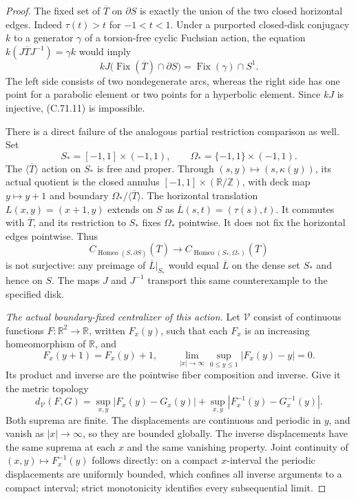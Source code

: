 \begin{proof}
The fixed set of $\overline T$ on $\partial S$ is
exactly the union of the two closed horizontal edges.
Indeed $\tau(t)>t$ for $-1<t<1$. Under a purported
closed-disk conjugacy $k$ to a generator $\gamma$ of
a torsion-free cyclic Fuchsian action, the equation
$k(J\overline T J^{-1})=\gamma k$ would imply
\[
       kJ\bigl(\operatorname{Fix}(\overline T)
                         \cap\partial S\bigr)
                  =\operatorname{Fix}(\gamma)\cap S^1.
                                                               \tag{C.71.11}
\]
The left side consists of two nondegenerate arcs,
whereas the right side has one point for a parabolic
element or two points for a hyperbolic element.
Since $kJ$ is injective, (C.71.11) is impossible.

There is a direct failure of the analogous partial
restriction comparison as well. Set
\[
 S_*=[-1,1]\times(-1,1),\qquad
 \Omega_*=\{-1,1\}\times(-1,1).
                                                               \tag{C.71.12}
\]
The $\langle\overline T\rangle$ action on $S_*$ is
free and proper. Through $(s,y)\mapsto(s,\kappa(y))$,
its actual quotient is the closed annulus
$[-1,1]\times(\mathbb R/\mathbb Z)$, with deck map
$y\mapsto y+1$ and boundary $\Omega_*/\langle\overline
T\rangle$. The horizontal translation $L(x,y)=(x+1,y)$
extends on $S$ as
$\overline L(s,t)=(\tau(s),t)$. It commutes with
$\overline T$, and its restriction to $S_*$ fixes
$\Omega_*$ pointwise. It does not fix the horizontal
edges pointwise. Thus
\[
 C_{\operatorname{Homeo}(S,\partial S)}(\overline T)
       \longrightarrow
 C_{\operatorname{Homeo}(S_*,\Omega_*)}(\overline T)
                                                               \tag{C.71.13}
\]
is not surjective: any preimage of $\overline L|_{S_*}$
would equal $\overline L$ on the dense set $S_*$ and
hence on $S$. The maps $J$ and $J^{-1}$ transport this
same counterexample to the specified disk.

\emph{The actual boundary-fixed centralizer of this action.}
Let $\mathcal V$ consist of continuous functions
$F:\mathbb R^2\to\mathbb R$, written $F_x(y)$, such that
each $F_x$ is an increasing homeomorphism of $\mathbb R$,
and
\[
 F_x(y+1)=F_x(y)+1,\qquad
 \lim_{|x|\to\infty}\sup_{0\leq y\leq1}
                         |F_x(y)-y|=0 .
                                                               \tag{C.71.14}
\]
Its product and inverse are the pointwise fiber
composition and inverse. Give it the metric topology
\[
 d_{\mathcal V}(F,G)=
  \sup_{x,y}|F_x(y)-G_x(y)|
   +\sup_{x,y}|F_x^{-1}(y)-G_x^{-1}(y)|.
                                                               \tag{C.71.15}
\]
Both suprema are finite. The displacements are
continuous and periodic in $y$, and vanish as
$|x|\to\infty$, so they are bounded globally.
The inverse displacements have the same suprema
at each $x$ and the same vanishing property.
Joint continuity of $(x,y)\mapsto F_x^{-1}(y)$
follows directly: on a compact $x$-interval the
periodic displacements are uniformly bounded,
which confines all inverse arguments to a compact
interval; strict monotonicity identifies every
subsequential limit.


\end{proof}
